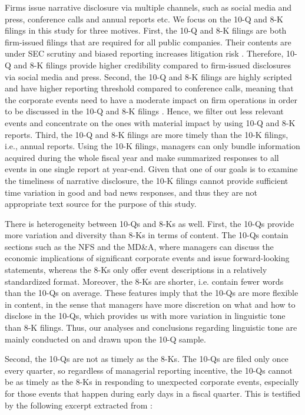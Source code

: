 \documentclass[letterpaper,11pt]{article}
\begin{document}
\begin{spacing}{1.5}
Firms issue narrative disclosure via multiple channels, such as social media and press, conference calls and annual reports etc. We focus on the 10-Q and 8-K filings in this study for three motives. First, the 10-Q and 8-K filings are both firm-issued filings that are required for all public companies. Their contents are under SEC scrutiny and biased reporting increases litigation risk . Therefore, 10-Q and 8-K filings provide higher credibility compared to firm-issued disclosures via social media and press. Second, the 10-Q and 8-K filings are highly scripted and have higher reporting threshold compared to conference calls, meaning that the corporate events need to have a moderate impact on firm operations in order to be discussed in the 10-Q and 8-K filings . Hence, we filter out less relevant events and concentrate on the ones with material impact by using 10-Q and 8-K reports. Third, the 10-Q and 8-K filings are more timely than the 10-K filings, i.e., annual reports. Using the 10-K filings, managers can only bundle information acquired during the whole fiscal year and make summarized responses to all events in one single report at year-end. Given that one of our goals is to examine the timeliness of narrative disclosure, the 10-K filings cannot provide sufficient time variation in good and bad news responses, and thus they are not appropriate text source for the purpose of this study.

There is heterogeneity between 10-Qs and 8-Ks as well. First, the 10-Qs provide more variation and diversity than 8-Ks in terms of content. The 10-Qs contain sections such as the NFS and the MD\&A, where managers can discuss the economic implications of significant corporate events and issue forward-looking statements, whereas the 8-Ks only offer event descriptions in a relatively standardized format. Moreover, the 8-Ks are shorter, i.e. contain fewer words than the 10-Qs on average. These features imply that the 10-Qs are more flexible in content, in the sense that managers have more discretion on what and how to disclose in the 10-Qs, which provides us with more variation in linguistic tone than 8-K filings. Thus, our analyses and conclusions regarding linguistic tone are mainly conducted on and drawn upon the 10-Q sample. 

Second, the 10-Qs are not as timely as the 8-Ks. The 10-Qs are filed only once every quarter, so regardless of managerial reporting incentive, the 10-Qs cannot be as timely as the 8-Ks in responding to unexpected corporate events, especially for those events that happen during early days in a fiscal quarter. This is testified by the following excerpt extracted from :


\end{spacing}
\end{document}
